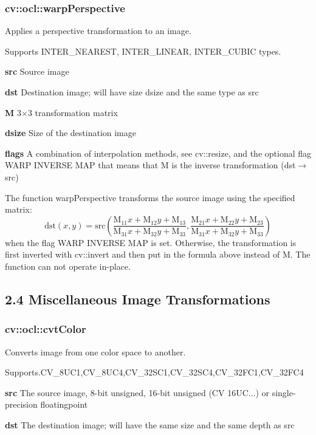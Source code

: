 \documentclass{article}
\begin{document}
\newpage

\subsubsection{cv::ocl::warpPerspective }
\label{subsubsec:mylabel47}
Applies a perspective transformation to an image.

Supports INTER{\_}NEAREST, INTER{\_}LINEAR, INTER{\_}CUBIC types.

\textbf{src }Source image

\textbf{dst }Destination image; will have size dsize and the same type as
src

\textbf{M }3$\times $3 transformation matrix

\textbf{dsize }Size of the destination image

\textbf{flags }A combination of interpolation methods, see cv::resize, and
the optional flag WARP INVERSE MAP that means that M is the inverse
transformation (dst$\to $src)

The function warpPerspective transforms the source image using the specified
matrix:
\[
\mbox{dst}(x,y)=\mbox{src}(\frac{\mbox{M}_{11} x+\mbox{M}_{12}
y+\mbox{M}_{13} }{\mbox{M}_{31} x+\mbox{M}_{32} y+\mbox{M}_{33}
},\frac{\mbox{M}_{21} x+\mbox{M}_{22} y+\mbox{M}_{23} }{\mbox{M}_{31}
x+\mbox{M}_{32} y+\mbox{M}_{33} })
\]
when the flag WARP INVERSE MAP is set. Otherwise, the transformation is
first inverted with cv::invert and then put in the formula above instead of
M. The function can not operate in-place.

\newpage

\subsection{2.4 Miscellaneous Image Transformations}
\label{subsec:mylabel6}
\subsubsection{cv::ocl::cvtColor}
\label{subsubsec:mylabel48}
Converts image from one color space to another.

Supports.CV{\_}8UC1,CV{\_}8UC4,CV{\_}32SC1,CV{\_}32SC4,CV{\_}32FC1,CV{\_}32FC4

\textbf{src }The source image, 8-bit unsigned, 16-bit unsigned (CV 16UC...)
or single-precision floatingpoint

\textbf{dst }The destination image; will have the same size and the same
depth as src
\end{document}
